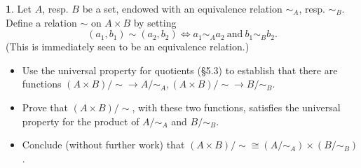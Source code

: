 \documentclass{article}
\theoremstyle{definition}
\newtheorem{ex}{}[section]
\begin{document}
\begin{ex}
	Let $A$, resp. $B$ be a set, endowed with an equivalence relation $\sim_A$, resp. $\sim_B$.
	Define a relation $\sim$ on $A \times B$ by setting \begin{equation*}
		(a_1, b_1) \sim (a_2, b_2) \iff a_1 \sim_A a_2\ \mathrm{and}\ b_1 \sim_B b_2.
	\end{equation*}
	(This is immediately seen to be an equivalence relation.)
	\begin{itemize}
		\item Use the universal property for quotients (\S 5.3) to establish that there are functions $(A \times B)/{\sim} \to A/{\sim_A}, (A \times B) / {\sim} \to B/{\sim_B}$.
		\item Prove that $(A \times B)/{\sim}$, with these two functions, satisfies the universal property for the product of $A/{\sim_A}$ and $B/{\sim_B}$.
		\item Conclude (without further work) that $(A \times B)/{\sim} \cong (A/{\sim_A}) \times (B/{\sim_B})$.
	\end{itemize}
\end{ex}
\end{document}
